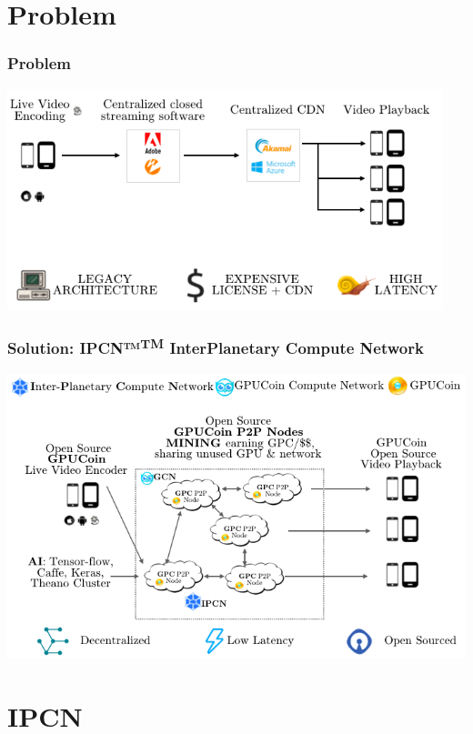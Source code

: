 \documentclass[10pt,handout]{beamer}
\begin{document}
\section{Problem}
\begin{frame}[t]\frametitle{Problem}
  \includegraphics[width=0.95\textwidth]{static/problem-architecture-trans-cmrfont}

\end{frame}
\begin{frame}[t]\frametitle{Solution: IPCN™\textsuperscript{TM} InterPlanetary Compute Network}
\includegraphics[width=.95\textwidth]{static/gpucoin-solution-trans-ai-cmrfont}

\end{frame}
\section{IPCN}

\end{document}

